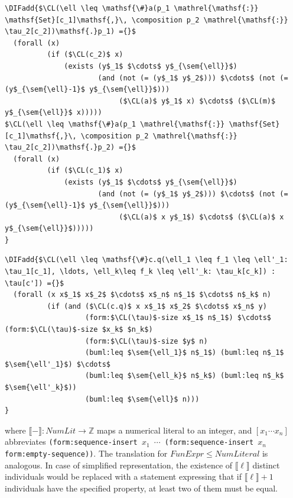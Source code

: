 \documentclass[10pt,fleqn,final]{scrreprt}
\newcommand*{\CL}{\ensuremath{\mathsf{CL}}\xspace}
\newcommand*{\DOL}{\ensuremath{\mathsf{DOL}}\xspace}
\newcommand{\informative}[0]{{\begin{center}{\Large{(Informative})}\end{center}} \bigskip}
\newcommand{\infannex}[1]{ \chapter{Annex: #1}  \informative }
\newenvironment{definitions}[0]{\medskip }{}
\newcommand{\composition}{\raisebox{0.2pt}{\begin{sideways}\fontsize{6pt}{6pt}\selectfont$\blacklozenge$\end{sideways}}}
\newcommand{\ZZ}{\mathbb{Z}}
\newcommand{\sem}[1]{\mathopen\llbracket#1\mathclose\rrbracket}
\providecommand{\DIFadd}[1]{{\protect\color{blue}\uwave{#1}}} %
\providecommand{\DIFaddbegin}{} %
\providecommand{\DIFaddend}{} %
\begin{document}
\begin{definitions}
\begin{lstlisting}[language=clif, mathescape]
\DIFadd{$\CL(\ell \leq \mathsf{\#}a(p_1 \mathrel{\mathsf{:}} \mathsf{Set}[c_1]\mathsf{,}\, \composition p_2 \mathrel{\mathsf{:}} \tau_2[c_2])\mathsf{.}p_1) ={}$
  (forall (x)
          (if ($\CL(c_2)$ x)
              (exists (y$_1$ $\cdots$ y$_{\sem{\ell}}$)
                      (and (not (= (y$_1$ y$_2$))) $\cdots$ (not (= (y$_{\sem{\ell}-1}$ y$_{\sem{\ell}}$)))
                           ($\CL(a)$ y$_1$ x) $\cdots$ ($\CL(m)$ y$_{\sem{\ell}}$ x)))))
$\CL(\ell \leq \mathsf{\#}a(p_1 \mathrel{\mathsf{:}} \mathsf{Set}[c_1]\mathsf{,}\, \composition p_2 \mathrel{\mathsf{:}} \tau_2[c_2])\mathsf{.}p_2) ={}$
  (forall (x)
          (if ($\CL(c_1)$ x)
              (exists (y$_1$ $\cdots$ y$_{\sem{\ell}}$)
                      (and (not (= (y$_1$ y$_2$))) $\cdots$ (not (= (y$_{\sem{\ell}-1}$ y$_{\sem{\ell}}$)))
                           ($\CL(a)$ x y$_1$) $\cdots$ ($\CL(a)$ x y$_{\sem{\ell}}$)))))
}\end{lstlisting}

\begin{lstlisting}[language=clif, mathescape]
\DIFadd{$\CL(\ell \leq \mathsf{\#}c.q(\ell_1 \leq f_1 \leq \ell'_1: \tau_1[c_1], \ldots, \ell_k\leq f_k \leq \ell'_k: \tau_k[c_k]) : \tau[c']) ={}$
  (forall (x x$_1$ x$_2$ $\cdots$ x$_n$ n$_1$ $\cdots$ n$_k$ n)
          (if (and ($\CL(c.q)$ x x$_1$ x$_2$ $\cdots$ x$_n$ y)
                   (form:$\CL(\tau)$-size x$_1$ n$_1$) $\cdots$ (form:$\CL(\tau)$-size $x_k$ $n_k$)
                   (form:$\CL(\tau)$-size $y$ n)
                   (buml:leq $\sem{\ell_1}$ n$_1$) (buml:leq n$_1$ $\sem{\ell'_1}$) $\cdots$
                   (buml:leq $\sem{\ell_k}$ n$_k$) (buml:leq n$_k$ $\sem{\ell'_k}$))
                   (buml:leq $\sem{\ell}$ n)))
}\end{lstlisting}
\DIFaddend %
where $\sem{-} : \mathit{NumLit} \to \ZZ$
maps a numerical literal to an integer, and $[x_1\cdots x_n]$
abbreviates \texttt{(form:sequence-insert $x_1$
  $\cdots$
  (form:sequence-insert $x_n$
  form:empty-sequence)\DIFaddbegin \DIFadd{$\cdots$}\DIFaddend )}.
The translation for $\mathit{FunExpr} \leq \mathit{NumLiteral}$
is analogous. In case of simplified representation, the existence of
$\sem{\ell}$
distinct individuals would be replaced with a statement expressing that
if $\sem{\ell}+1$
individuals have the specified property, at least two of them must be
equal.






\end{definitions}
\end{document}
